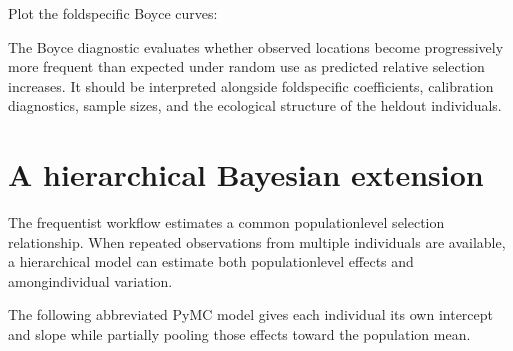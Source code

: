 \documentclass[letterpaper,10pt,english]{sphinxmanual}
\begin{document}
\sphinxAtStartPar
Plot the fold\sphinxhyphen{}specific Boyce curves:

\begin{sphinxVerbatim}[commandchars=\\\{\}]
   
\end{sphinxVerbatim}

\sphinxAtStartPar
The Boyce diagnostic evaluates whether observed locations become progressively more frequent than expected under random use as predicted relative selection increases. It should be interpreted alongside fold\sphinxhyphen{}specific coefficients, calibration diagnostics, sample sizes, and the ecological structure of the held\sphinxhyphen{}out individuals.


\section{A hierarchical Bayesian extension}
\label{\detokenize{getting_started:a-hierarchical-bayesian-extension}}
\sphinxAtStartPar
The frequentist workflow estimates a common population\sphinxhyphen{}level selection relationship. When repeated observations from multiple individuals are available, a hierarchical model can estimate both population\sphinxhyphen{}level effects and among\sphinxhyphen{}individual variation.

\sphinxAtStartPar
The following abbreviated PyMC model gives each individual its own intercept and slope while partially pooling those effects toward the population mean.
\end{document}
